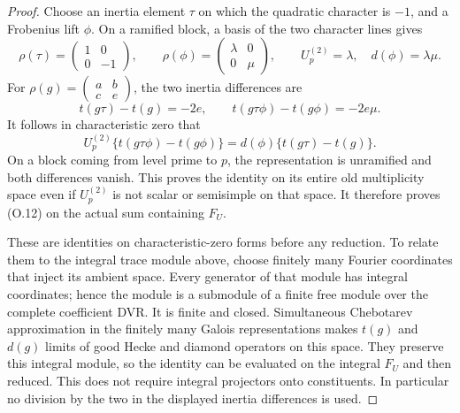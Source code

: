 \documentclass[11pt]{article}
\theoremstyle{definition}
\theoremstyle{remark}
\begin{document}
\begin{proof}
Choose an inertia element $\tau$ on which the quadratic character
is $-1$, and a Frobenius lift $\phi$. On a ramified block, a basis
of the two character lines gives
\[
 \rho(\tau)=\begin{pmatrix}1&0\\0&-1\end{pmatrix},\qquad
 \rho(\phi)=\begin{pmatrix}\lambda&0\\0&\mu\end{pmatrix},
 \qquad U_p^{(2)}=\lambda,\quad d(\phi)=\lambda\mu.
\]
For $\rho(g)=\left(\begin{smallmatrix}a&b\\c&e\end{smallmatrix}\right)$,
the two inertia differences are
\[
 t(g\tau)-t(g)=-2e,\qquad
 t(g\tau\phi)-t(g\phi)=-2e\mu.
\]
It follows in characteristic zero that
\[
 U_p^{(2)}\{t(g\tau\phi)-t(g\phi)\}
       =d(\phi)\{t(g\tau)-t(g)\}.                       \tag{O.12}
\]
On a block coming from level prime to $p$, the representation is
unramified and both differences vanish. This proves the identity
on its entire old multiplicity space even if $U_p^{(2)}$ is not
scalar or semisimple on that space. It therefore proves (O.12)
on the actual sum containing $F_U$.

These are identities on characteristic-zero forms before any
reduction. To relate them to the integral trace module above, choose
finitely many Fourier coordinates that inject its ambient space.
Every generator of that module has integral coordinates; hence the
module is a submodule of a finite free module over the complete
coefficient DVR. It is finite and closed. Simultaneous Chebotarev
approximation in the finitely many Galois representations makes
$t(g)$ and $d(g)$ limits of good Hecke and diamond operators on this
space. They preserve this integral module, so the identity can be
evaluated on the integral $F_U$ and then reduced. This does not
require integral projectors onto constituents. In particular no
division by the two in the displayed inertia differences is used.



\end{proof}
\end{document}
